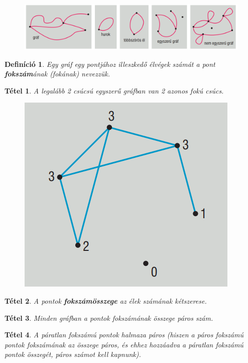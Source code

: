 \documentclass[12pt,a4paper]{article}
\newtheorem{theorem}{Tétel} [section]
\newtheorem{definition}{Definíció} [section]
\begin{document}
\begin{figure}[h]
\centering
\includegraphics[scale=0.3]{geometry/grafok}
\end{figure}

\begin{definition}
Egy gráf egy pontjához illeszkedő élvégek számát a pont \textbf{fokszám}ának (fokának) nevezzük.
\end{definition}
\newpage
\begin{theorem}
A legalább 2 csúcsú egyszerű gráfban van 2 azonos fokú csúcs.
\begin{figure}[h]
\centering
\includegraphics[scale=0.3]{geometry/graf}
\end{figure}
\end{theorem}

\begin{theorem}
A pontok \textbf{fokszámösszege} az élek számának kétszerese.
\end{theorem}

\begin{theorem}
Minden gráfban a pontok fokszámának összege páros szám.
\end{theorem}

\begin{theorem}
A páratlan fokszámú pontok halmaza páros (hiszen a páros fokszámú pontok fokszámának az összege páros, és ehhez hozzáadva a páratlan fokszámú pontok összegét, páros számot kell kapnunk).
\end{theorem}
\end{document}
